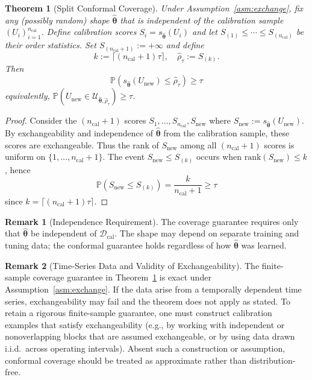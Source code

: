 \documentclass[lettersize,journal]{IEEEtran}
\newcommand{\Prob}{\mathbb{P}}
\newcommand{\cU}{\mathcal{U}}
\newcommand{\cD}{\mathcal{D}}
\newcommand{\btheta}{\bm{\theta}}
\newtheorem{theorem}{Theorem}
\theoremstyle{definition}
\newtheorem{remark}{Remark}
\begin{document}
\begin{theorem}[Split Conformal Coverage]\label{thm:conformal}
Under Assumption~\ref{asm:exchange}, fix any (possibly random) shape $\hat{\btheta}$ that is independent of the calibration sample $(U_i)_{i=1}^{n_{\text{cal}}}$. Define calibration scores $S_i = s_{\hat{\btheta}}(U_i)$ and let $S_{(1)} \leq \cdots \leq S_{(n_{\text{cal}})}$ be their order statistics. Set $S_{(n_{\text{cal}}+1)} := +\infty$ and define
\begin{equation}\label{eq:conformal-rho}
k := \lceil (n_{\text{cal}}+1)\tau \rceil, \quad \hat{\rho}_\tau := S_{(k)}.
\end{equation}
Then
\begin{equation}
\Prob(s_{\hat{\btheta}}(U_{\text{new}}) \leq \hat{\rho}_\tau) \geq \tau
\end{equation}
equivalently, $\Prob(U_{\text{new}} \in \cU_{\hat{\btheta}, \hat{\rho}_\tau}) \geq \tau$.
\end{theorem}

\begin{proof}
Consider the $(n_{\text{cal}}+1)$ scores $S_1, \ldots, S_{n_{\text{cal}}}, S_{\text{new}}$ where $S_{\text{new}} := s_{\hat{\btheta}}(U_{\text{new}})$. By exchangeability and independence of $\hat{\btheta}$ from the calibration sample, these scores are exchangeable. Thus the rank of $S_{\text{new}}$ among all $(n_{\text{cal}}+1)$ scores is uniform on $\{1, \ldots, n_{\text{cal}}+1\}$. The event $S_{\text{new}} \leq S_{(k)}$ occurs when $\text{rank}(S_{\text{new}}) \leq k$, hence
\begin{equation}
\Prob(S_{\text{new}} \leq S_{(k)}) = \frac{k}{n_{\text{cal}}+1} \geq \tau
\end{equation}
since $k = \lceil (n_{\text{cal}}+1)\tau \rceil$.
\end{proof}

\begin{remark}[Independence Requirement]
The coverage guarantee requires only that $\hat{\btheta}$ be independent of $\cD_{\text{cal}}$. The shape may depend on separate training and tuning data; the conformal guarantee holds regardless of how $\hat{\btheta}$ was learned.
\end{remark}

\begin{remark}[Time-Series Data and Validity of Exchangeability]
The finite-sample coverage guarantee in Theorem~\ref{thm:conformal} is exact under Assumption~\ref{asm:exchange}.
If the data arise from a temporally dependent time series, exchangeability may fail and the theorem does not apply as stated.
To retain a rigorous finite-sample guarantee, one must construct calibration examples that satisfy exchangeability
(e.g., by working with independent or nonoverlapping blocks that are assumed exchangeable, or by using data drawn i.i.d.\ across operating intervals).
Absent such a construction or assumption, conformal coverage should be treated as approximate rather than distribution-free.
\end{remark}
\end{document}
